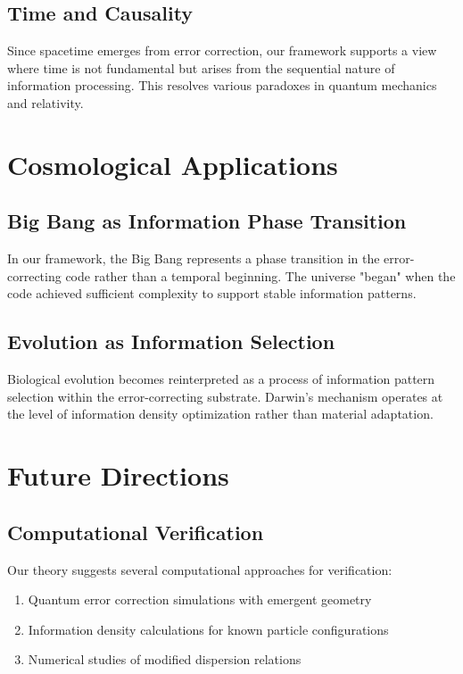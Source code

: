 \documentclass[12pt]{article}
\begin{document}
\subsection{Time and Causality}

Since spacetime emerges from error correction, our framework supports a view where time is not fundamental but arises from the sequential nature of information processing. This resolves various paradoxes in quantum mechanics and relativity.

\section{Cosmological Applications}

\subsection{Big Bang as Information Phase Transition}

In our framework, the Big Bang represents a phase transition in the error-correcting code rather than a temporal beginning. The universe "began" when the code achieved sufficient complexity to support stable information patterns.

\subsection{Evolution as Information Selection}

Biological evolution becomes reinterpreted as a process of information pattern selection within the error-correcting substrate. Darwin's mechanism operates at the level of information density optimization rather than material adaptation.

\section{Future Directions}

\subsection{Computational Verification}

Our theory suggests several computational approaches for verification:

\begin{enumerate}
\item Quantum error correction simulations with emergent geometry
\item Information density calculations for known particle configurations  
\item Numerical studies of modified dispersion relations
\end{enumerate}
\end{document}
